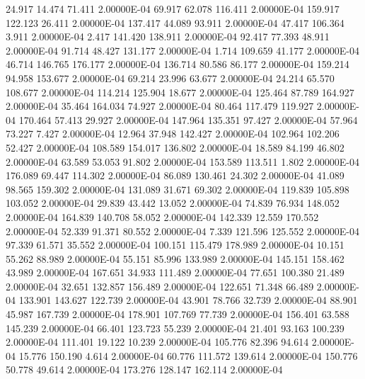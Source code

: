     24.917    14.474    71.411  2.00000E-04
    69.917    62.078   116.411  2.00000E-04
   159.917   122.123    26.411  2.00000E-04
   137.417    44.089    93.911  2.00000E-04
    47.417   106.364     3.911  2.00000E-04
     2.417   141.420   138.911  2.00000E-04
    92.417    77.393    48.911  2.00000E-04
    91.714    48.427   131.177  2.00000E-04
     1.714   109.659    41.177  2.00000E-04
    46.714   146.765   176.177  2.00000E-04
   136.714    80.586    86.177  2.00000E-04
   159.214    94.958   153.677  2.00000E-04
    69.214    23.996    63.677  2.00000E-04
    24.214    65.570   108.677  2.00000E-04
   114.214   125.904    18.677  2.00000E-04
   125.464    87.789   164.927  2.00000E-04
    35.464   164.034    74.927  2.00000E-04
    80.464   117.479   119.927  2.00000E-04
   170.464    57.413    29.927  2.00000E-04
   147.964   135.351    97.427  2.00000E-04
    57.964    73.227     7.427  2.00000E-04
    12.964    37.948   142.427  2.00000E-04
   102.964   102.206    52.427  2.00000E-04
   108.589   154.017   136.802  2.00000E-04
    18.589    84.199    46.802  2.00000E-04
    63.589    53.053    91.802  2.00000E-04
   153.589   113.511     1.802  2.00000E-04
   176.089    69.447   114.302  2.00000E-04
    86.089   130.461    24.302  2.00000E-04
    41.089    98.565   159.302  2.00000E-04
   131.089    31.671    69.302  2.00000E-04
   119.839   105.898   103.052  2.00000E-04
    29.839    43.442    13.052  2.00000E-04
    74.839    76.934   148.052  2.00000E-04
   164.839   140.708    58.052  2.00000E-04
   142.339    12.559   170.552  2.00000E-04
    52.339    91.371    80.552  2.00000E-04
     7.339   121.596   125.552  2.00000E-04
    97.339    61.571    35.552  2.00000E-04
   100.151   115.479   178.989  2.00000E-04
    10.151    55.262    88.989  2.00000E-04
    55.151    85.996   133.989  2.00000E-04
   145.151   158.462    43.989  2.00000E-04
   167.651    34.933   111.489  2.00000E-04
    77.651   100.380    21.489  2.00000E-04
    32.651   132.857   156.489  2.00000E-04
   122.651    71.348    66.489  2.00000E-04
   133.901   143.627   122.739  2.00000E-04
    43.901    78.766    32.739  2.00000E-04
    88.901    45.987   167.739  2.00000E-04
   178.901   107.769    77.739  2.00000E-04
   156.401    63.588   145.239  2.00000E-04
    66.401   123.723    55.239  2.00000E-04
    21.401    93.163   100.239  2.00000E-04
   111.401    19.122    10.239  2.00000E-04
   105.776    82.396    94.614  2.00000E-04
    15.776   150.190     4.614  2.00000E-04
    60.776   111.572   139.614  2.00000E-04
   150.776    50.778    49.614  2.00000E-04
   173.276   128.147   162.114  2.00000E-04
